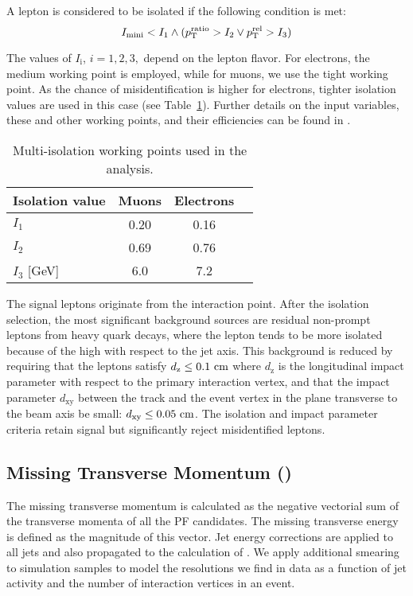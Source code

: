 A lepton is considered to be isolated if the following condition is met:
\begin{equation}
	I_\text{mini} < I_1 \wedge ( p_{\mathrm{T}}^\text{ratio} > I_2 \vee p_{\mathrm{T}}^\text{rel} > I_3 )
\end{equation}

The values of $I_\text{i}$, $i = 1,2,3,$ depend on the lepton flavor. For electrons, the medium working point is employed, while for muons, we use the tight working point. As the chance of misidentification is higher for electrons, tighter isolation values are used in this case (see Table~\ref{tab:isoWPs}). Further details on the input variables, these and other working points, and their efficiencies can be found in \cite{CMS-PAS-SUS-15-008}.

\begin{table}
\centering
\caption{Multi-isolation working points used in the analysis.} \label{tab:isoWPs}
\begin{tabular}{l ccc}
\hline\hline
Isolation value & Muons & Electrons  \\
\hline
$I_1$ & 0.20 & 0.16 \\
$I_2$ & 0.69 & 0.76 \\
$I_3$ [GeV] & 6.0 & 7.2 \\
\hline
\end{tabular}
\end{table}

The signal leptons originate from the interaction point. After the isolation selection, the most significant background sources are residual non-prompt leptons from heavy quark decays, where the lepton tends to be more isolated because of the high \pt with respect to the jet axis. This background is reduced by requiring that the leptons satisfy $d_\textrm{z} \leq 0.1\,\,\text{cm}$ where $d_\textrm{z}$ is the longitudinal impact parameter with respect to the primary interaction vertex, and that the impact parameter $d_\textrm{xy}$ between the track and the event vertex in the plane transverse to the beam axis be small: $d_\textrm{xy} \leq 0.05\,\,\text{cm}$. The isolation and impact parameter criteria retain signal but significantly reject misidentified leptons.

\subsection{Missing Transverse Momentum (\MET)}
The missing transverse momentum is calculated as the negative vectorial sum of the transverse momenta of all the PF candidates. The missing transverse energy \MET is defined as the magnitude of this vector. Jet energy corrections are applied to all jets and also propagated to the calculation of \MET \cite{CMS-PAS-JME-12-002}. We apply additional smearing to simulation samples to model the \MET resolutions we find in data as a function of jet activity and the number of interaction vertices in an event.


